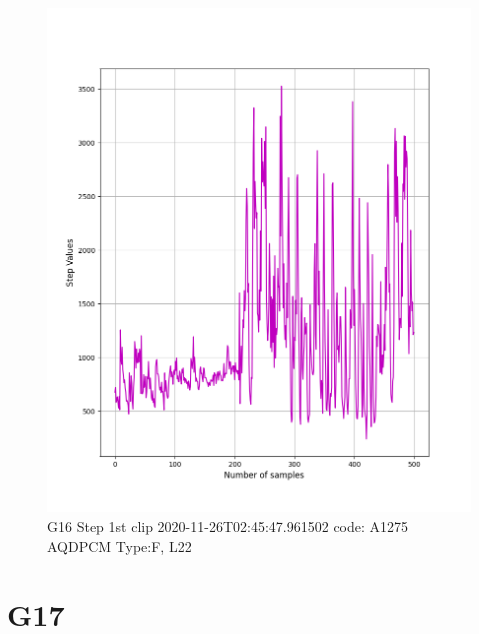 \documentclass[hidelinks, 12pt, a4paper]{article}
\begin{document}
\begin{figure}[h!]
\centering
	\includegraphics[height=.4\textheight, width=\textwidth]{assets/session1/g16.png}
    \caption{G16 Step 1st clip  2020-11-26T02:45:47.961502 code: A1275 AQDPCM Type:F, L22}
\end{figure}

\section{G17}
\end{document}
